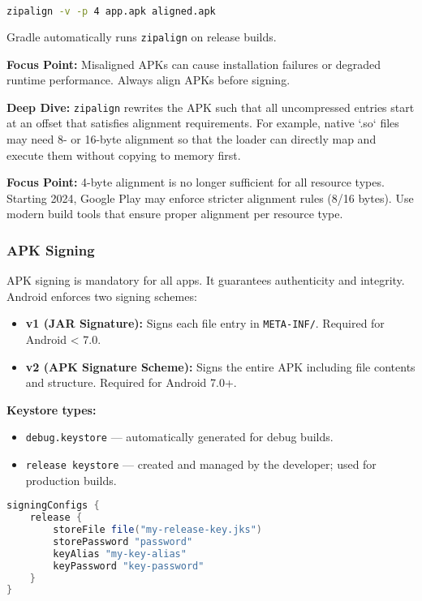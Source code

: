 \documentclass[a4paper,12pt]{article}
\begin{document}
\begin{lstlisting}[language=bash]
zipalign -v -p 4 app.apk aligned.apk
\end{lstlisting}

Gradle automatically runs \texttt{zipalign} on release builds.

\textbf{Focus Point:}  
Misaligned APKs can cause installation failures or degraded runtime performance. Always align APKs before signing.

\textbf{Deep Dive:}  
\texttt{zipalign} rewrites the APK such that all uncompressed entries start at an offset that satisfies alignment requirements. For example, native `.so` files may need 8- or 16-byte alignment so that the loader can directly map and execute them without copying to memory first.

\textbf{Focus Point:} 4-byte alignment is no longer sufficient for all resource types. Starting 2024, Google Play may enforce stricter alignment rules (8/16 bytes). Use modern build tools that ensure proper alignment per resource type.

\subsubsection{APK Signing}

APK signing is mandatory for all apps. It guarantees authenticity and integrity. Android enforces two signing schemes:

\begin{itemize}
  \item \textbf{v1 (JAR Signature):} Signs each file entry in \texttt{META-INF/}. Required for Android < 7.0.
  \item \textbf{v2 (APK Signature Scheme):} Signs the entire APK including file contents and structure. Required for Android 7.0+.
\end{itemize}

\textbf{Keystore types:}
\begin{itemize}
  \item \texttt{debug.keystore} — automatically generated for debug builds.
  \item \texttt{release keystore} — created and managed by the developer; used for production builds.
\end{itemize}

\begin{lstlisting}[language=Groovy]
signingConfigs {
    release {
        storeFile file("my-release-key.jks")
        storePassword "password"
        keyAlias "my-key-alias"
        keyPassword "key-password"
    }
}
\end{lstlisting}
\end{document}
